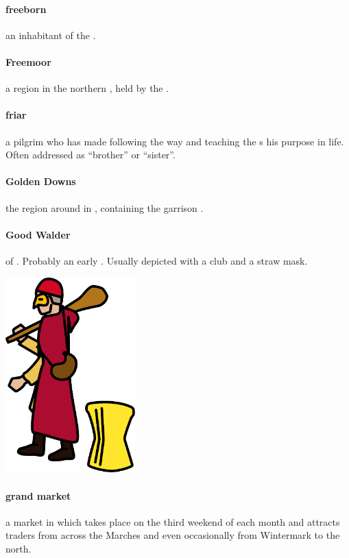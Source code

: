 \paragraph{freeborn} an inhabitant of the .
\paragraph{Freemoor} a region in the northern , held by the .
\paragraph{friar} a pilgrim who has made following the way and teaching the s his purpose in life. Often addressed as “brother” or “sister”.
\paragraph{Golden Downs} the region around  in , containing the garrison .
\paragraph{Good Walder}  of . Probably an early . Usually depicted with a club and a straw mask. \begin{center}\includegraphics[width=5cm]{encyclopedia/Walder} \end{center}
\paragraph{grand market} a market in  which takes place on the third weekend of each month and attracts traders from across the Marches and even occasionally from Wintermark to the north. 
